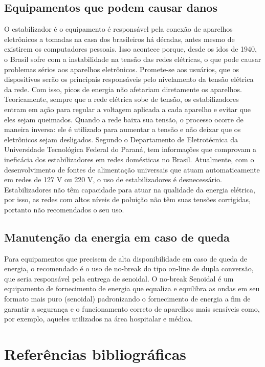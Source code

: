\documentclass[	DIV=calc,%
							paper=a4,%
							fontsize=12pt,%
							onecolumn]{scrartcl}	 					%
\begin{document}
\subsection{Equipamentos que podem causar danos}
O estabilizador é o equipamento é responsável pela conexão de aparelhos eletrônicos a tomadas na casa dos brasileiros há décadas, antes mesmo de existirem os computadores pessoais. Isso acontece porque, desde os idos de 1940, o Brasil sofre com a instabilidade na tensão das redes elétricas, o que pode causar problemas sérios aos aparelhos eletrônicos. Promete-se aos usuários, que os dispositivos serão os principais responsáveis pelo nivelamento da tensão elétrica da rede. Com isso, picos de energia não afetariam diretamente os aparelhos. Teoricamente, sempre que a rede elétrica sobe de tensão, os estabilizadores entram em ação para regular a voltagem aplicada a cada aparelho e evitar que eles sejam queimados. Quando a rede baixa sua tensão, o processo ocorre de maneira inversa: ele é utilizado para aumentar a tensão e não deixar que os eletrônicos sejam desligados. Segundo o Departamento de Eletrotécnica da Universidade Tecnológica Federal do Paraná, tem informações que comprovam a ineficácia dos estabilizadores em redes domésticas no Brasil. Atualmente, com o desenvolvimento de fontes de alimentação universais que atuam automaticamente em redes de 127 V ou 220 V, o uso de estabilizadores é desnecessário. Estabilizadores não têm capacidade para atuar na qualidade da energia elétrica, por isso, as redes com altos níveis de poluição não têm suas tensões corrigidas, portanto não recomendados o seu uso. 

\subsection{Manutenção da energia em caso de queda}
Para equipamentos que precisem de alta disponibilidade em caso de queda de energia, o recomendado é o uso de no-break do tipo on-line de dupla conversão, que seria responsável pela entrega de senoidal. O no-break Senoidal é um equipamento de fornecimento de energia que equaliza e equilibra as ondas em seu formato mais puro (senoidal) padronizando o fornecimento de energia a fim de garantir a segurança e o funcionamento correto de aparelhos mais sensíveis como, por exemplo, aqueles utilizados na área hospitalar e médica.

\pagebreak
\section{Referências bibliográficas}

\renewcommand\refname{} %

    
\end{document}
